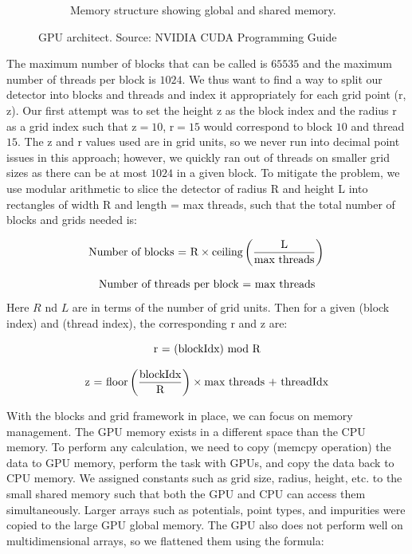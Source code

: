 \begin{figure}
\begin{subfigure}{0.48\textwidth}
 \caption{Memory structure showing global and shared memory.} \label{fig:GPU_basics_b}
 \end{subfigure}
\caption{GPU architect. Source: NVIDIA CUDA {\cpp}  Programming Guide} \label{fig:GPU_basics}
\end{figure}

The maximum number of blocks that can be called is $65535$ and the maximum number of threads per block is $1024$. We thus want to find a way to split our detector into blocks and threads and index it appropriately for each grid point (r, z). Our first attempt was to set the height z as the block index and the radius r as a grid index such that z$=10$, r$=15$ would correspond to block $10$ and thread $15$. The z and r values used are in grid units, so we never run into decimal point issues in this approach; however, we quickly ran out of threads on smaller grid sizes as there can be at most $1024$ in a given block. To mitigate the problem, we use modular arithmetic to slice the detector of radius R and height L into rectangles of width R and length = max threads, such that the total number of blocks and grids needed is:

\begin{equation}{\label{nu_b}}
 \text{Number of blocks = R}\times \text{ceiling} \left( \frac{\text{L}}{\text{max threads}} \right) \\
\end{equation}

\begin{equation}{\label{nu_g}}
 \text{Number of threads per block = max threads}
\end{equation}
Here $R$ nd $L$ are in terms of the number of grid units. Then for a given (block index) and (thread index), the corresponding r and z are:

\begin{equation}{\label{r_eq}}
 \text{r = (blockIdx) mod R} \\
\end{equation}

\begin{equation}{\label{z_eq}}
 \text{z = floor}\left(\frac{\text{blockIdx}}{\text{R}}\right) \times \text{max threads + threadIdx}
\end{equation}

With the blocks and grid framework in place, we can focus on memory management. The GPU memory exists in a different space than the CPU memory. To perform any calculation, we need to copy (memcpy operation) the data to GPU memory, perform the task with GPUs, and copy the data back to CPU memory. We assigned constants such as grid size, radius, height, etc. to the small shared memory such that both the GPU and CPU can access them simultaneously. Larger arrays such as potentials, point types, and impurities were copied to the large GPU global memory. The GPU also does not perform well on multidimensional arrays, so we flattened them using the formula:

